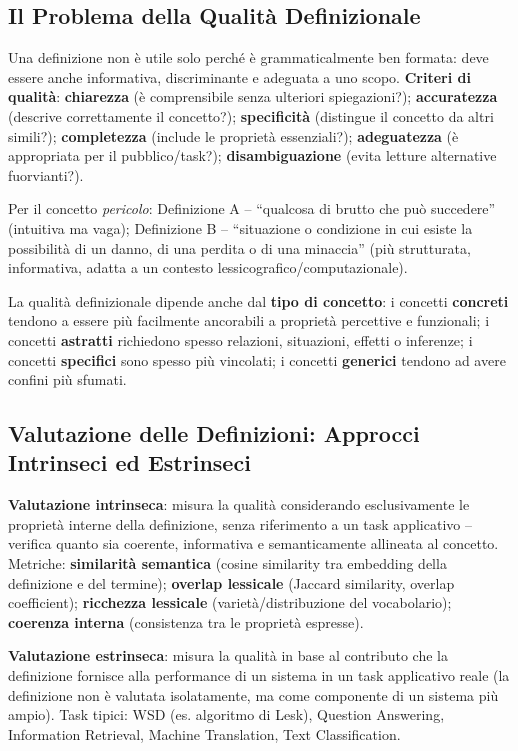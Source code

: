 \documentclass[12pt,a4paper]{article}
\begin{document}
\subsection{Il Problema della Qualit\`a Definizionale}

Una definizione non \`e utile solo perch\'e \`e grammaticalmente ben formata: deve essere anche informativa, discriminante e adeguata a uno scopo. \textbf{Criteri di qualit\`a}: \textbf{chiarezza} (\`e comprensibile senza ulteriori spiegazioni?); \textbf{accuratezza} (descrive correttamente il concetto?); \textbf{specificit\`a} (distingue il concetto da altri simili?); \textbf{completezza} (include le propriet\`a essenziali?); \textbf{adeguatezza} (\`e appropriata per il pubblico/task?); \textbf{disambiguazione} (evita letture alternative fuorvianti?).

\begin{examplebox}
Per il concetto \textit{pericolo}: Definizione A -- ``qualcosa di brutto che pu\`o succedere'' (intuitiva ma vaga); Definizione B -- ``situazione o condizione in cui esiste la possibilit\`a di un danno, di una perdita o di una minaccia'' (pi\`u strutturata, informativa, adatta a un contesto lessicografico/computazionale).
\end{examplebox}

La qualit\`a definizionale dipende anche dal \textbf{tipo di concetto}: i concetti \textbf{concreti} tendono a essere pi\`u facilmente ancorabili a propriet\`a percettive e funzionali; i concetti \textbf{astratti} richiedono spesso relazioni, situazioni, effetti o inferenze; i concetti \textbf{specifici} sono spesso pi\`u vincolati; i concetti \textbf{generici} tendono ad avere confini pi\`u sfumati.

\subsection{Valutazione delle Definizioni: Approcci Intrinseci ed Estrinseci}

\begin{defbox}
\textbf{Valutazione intrinseca}: misura la qualit\`a considerando esclusivamente le propriet\`a interne della definizione, senza riferimento a un task applicativo -- verifica quanto sia coerente, informativa e semanticamente allineata al concetto. Metriche: \textbf{similarit\`a semantica} (cosine similarity tra embedding della definizione e del termine); \textbf{overlap lessicale} (Jaccard similarity, overlap coefficient); \textbf{ricchezza lessicale} (variet\`a/distribuzione del vocabolario); \textbf{coerenza interna} (consistenza tra le propriet\`a espresse).

\textbf{Valutazione estrinseca}: misura la qualit\`a in base al contributo che la definizione fornisce alla performance di un sistema in un task applicativo reale (la definizione non \`e valutata isolatamente, ma come componente di un sistema pi\`u ampio). Task tipici: WSD (es. algoritmo di Lesk), Question Answering, Information Retrieval, Machine Translation, Text Classification.
\end{defbox}
\end{document}

